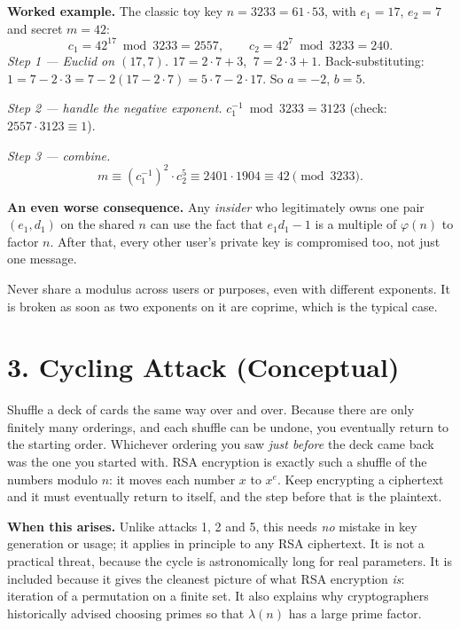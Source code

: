 \documentclass[11pt]{article}
\begin{document}
\textbf{Worked example.} The classic toy key $n=3233=61\cdot53$, with $e_1=17$, $e_2=7$ and secret $m=42$:
\[
c_1=42^{17}\bmod3233=2557,\qquad c_2=42^{7}\bmod3233=240.
\]
\emph{Step 1 --- Euclid on $(17,7)$.}
$17=2\cdot7+3$, $\ 7=2\cdot3+1$. Back-substituting: $1=7-2\cdot3=7-2(17-2\cdot7)=5\cdot7-2\cdot17$. So $a=-2$, $b=5$.

\emph{Step 2 --- handle the negative exponent.} $c_1^{-1}\bmod3233=3123$ (check: $2557\cdot3123\equiv1$).

\emph{Step 3 --- combine.}
\[
m\equiv (c_1^{-1})^{2}\cdot c_2^{5} \equiv 2401\cdot1904 \equiv 42 \pmod{3233}.
\]

\textbf{An even worse consequence.} Any \emph{insider} who legitimately owns one pair $(e_1,d_1)$ on the shared $n$ can use the fact that $e_1d_1-1$ is a multiple of $\varphi(n)$ to factor $n$. After that, every other user's private key is compromised too, not just one message.

\begin{fixbox}
Never share a modulus across users or purposes, even with different exponents. It is broken as soon as two exponents on it are coprime, which is the typical case.
\end{fixbox}

\hrulefill

\section*{3. Cycling Attack (Conceptual)}

\begin{intuition}
Shuffle a deck of cards the same way over and over. Because there are only finitely many orderings, and each shuffle can be undone, you eventually return to the starting order. Whichever ordering you saw \emph{just before} the deck came back was the one you started with. RSA encryption is exactly such a shuffle of the numbers modulo $n$: it moves each number $x$ to $x^e$. Keep encrypting a ciphertext and it must eventually return to itself, and the step before that is the plaintext.
\end{intuition}

\textbf{When this arises.} Unlike attacks 1, 2 and 5, this needs \emph{no} mistake in key generation or usage; it applies in principle to any RSA ciphertext. It is not a practical threat, because the cycle is astronomically long for real parameters. It is included because it gives the cleanest picture of what RSA encryption \emph{is}: iteration of a permutation on a finite set. It also explains why cryptographers historically advised choosing primes so that $\lambda(n)$ has a large prime factor.
\end{document}
